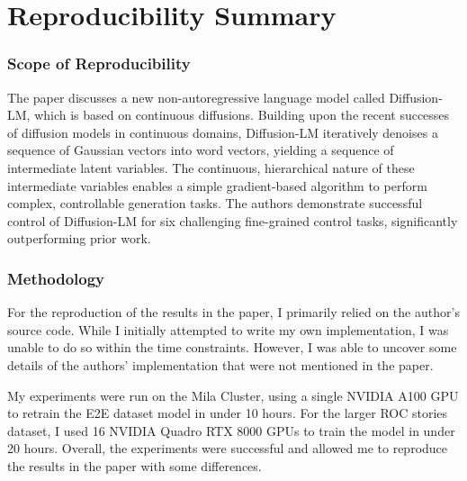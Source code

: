 \section*{\centering Reproducibility Summary}

\subsubsection*{Scope of Reproducibility}


The paper discusses a new non-autoregressive language model called Diffusion-LM, which is based on continuous diffusions. Building upon the recent successes of diffusion models in continuous domains, Diffusion-LM iteratively denoises a sequence of Gaussian vectors into word vectors, yielding a sequence of intermediate latent variables. The continuous, hierarchical nature of these intermediate variables enables a simple gradient-based algorithm to perform complex, controllable generation tasks. The authors demonstrate successful control of Diffusion-LM for six challenging fine-grained control tasks, significantly outperforming prior work.

\subsubsection*{Methodology}


For the reproduction of the results in the paper, I primarily relied on the author's source code. While I initially attempted to write my own implementation, I was unable to do so within the time constraints. However, I was able to uncover some details of the authors' implementation that were not mentioned in the paper.

My experiments were run on the Mila Cluster, using a single NVIDIA A100 GPU to retrain the E2E dataset model in under 10 hours. For the larger ROC stories dataset, I used 16 NVIDIA Quadro RTX 8000 GPUs to train the model in under 20 hours. Overall, the experiments were successful and allowed me to reproduce the results in the paper with some differences.

